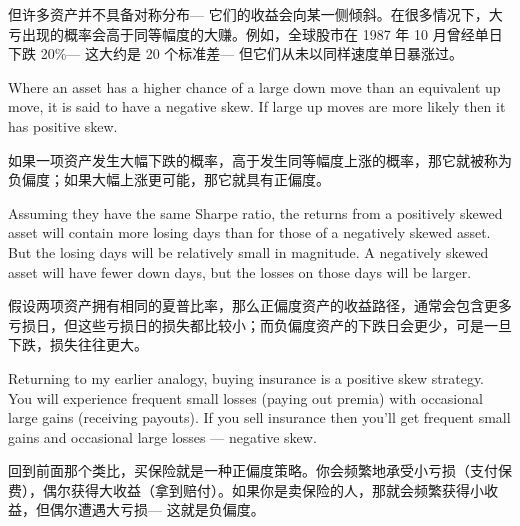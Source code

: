 \begin{chineseblock}但许多资产并不具备对称分布--- 它们的收益会向某一侧倾斜。在很多情况下，大亏出现的概率会高于同等幅度的大赚。例如，全球股市在 1987 年 10 月曾经单日下跌 20\%--- 这大约是 20 个标准差--- 但它们从未以同样速度单日暴涨过。\end{chineseblock}

\bipairgap

\begin{englishblock} Where an asset has a higher chance of a large down move than an equivalent up move, it is said to have a negative skew. If large up moves are more likely then it has positive skew. \end{englishblock}

\begin{chineseblock}如果一项资产发生大幅下跌的概率，高于发生同等幅度上涨的概率，那它就被称为负偏度；如果大幅上涨更可能，那它就具有正偏度。\end{chineseblock}

\bipairgap

\begin{englishblock} Assuming they have the same Sharpe ratio, the returns from a positively skewed asset will contain more losing days than for those of a negatively skewed asset. But the losing days will be relatively small in magnitude. A negatively skewed asset will have fewer down days, but the losses on those days will be larger. \end{englishblock}

\begin{chineseblock}假设两项资产拥有相同的夏普比率，那么正偏度资产的收益路径，通常会包含更多亏损日，但这些亏损日的损失都比较小；而负偏度资产的下跌日会更少，可是一旦下跌，损失往往更大。\end{chineseblock}

\bipairgap

\begin{englishblock} Returning to my earlier analogy, buying insurance is a positive skew strategy. You will experience frequent small losses (paying out premia) with occasional large gains (receiving payouts). If you sell insurance then you'll get frequent small gains and occasional large losses --- negative skew. \end{englishblock}

\begin{chineseblock}回到前面那个类比，买保险就是一种正偏度策略。你会频繁地承受小亏损（支付保费），偶尔获得大收益（拿到赔付）。如果你是卖保险的人，那就会频繁获得小收益，但偶尔遭遇大亏损--- 这就是负偏度。\end{chineseblock}

